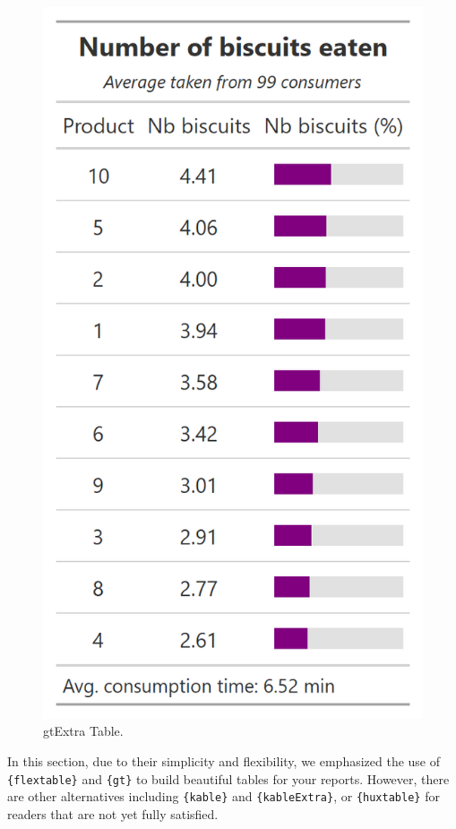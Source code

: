 \documentclass[
]{krantz}
\begin{document}
\begin{figure}

{\centering \includegraphics[width=0.9\linewidth]{images/gt_table_3} 

}

\caption{gtExtra Table.}\label{fig:gttextratable}
\end{figure}

In this section, due to their simplicity and flexibility, we emphasized the use of \texttt{\{flextable\}} and \texttt{\{gt\}} to build beautiful tables for your reports. However, there are other alternatives including \texttt{\{kable\}} and \texttt{\{kableExtra\}}, or \texttt{\{huxtable\}} for readers that are not yet fully satisfied.
\end{document}
